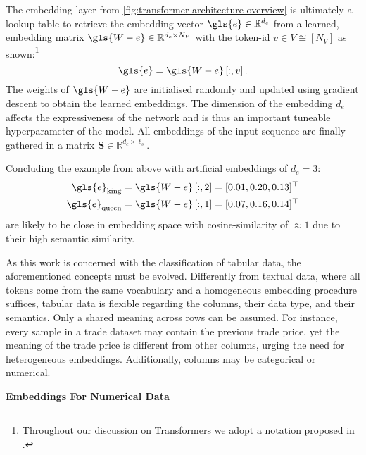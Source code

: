 The embedding layer from \cref{fig:transformer-architecture-overview} is ultimately a lookup table to retrieve the embedding vector $\gls{e} \in \mathbb{R}^{d_{e}}$ from a learned, embedding matrix $\gls{W-e} \in \mathbb{R}^{d_{e} \times N_{V}}$ with the token-id $v \in V \cong\left[N_{V}\right]$ as shown:\footnote{Throughout our discussion on Transformers we adopt a notation proposed in \textcite[][1--16]{phuongFormalAlgorithmsTransformers2022}.}
\begin{equation}
    \gls{e}=\gls{W-e}\left[:, v\right].
    \label{eq:word-embeddings}
\end{equation}
The weights of $\gls{W-e}$ are initialised randomly and updated using gradient descent to obtain the learned embeddings. The dimension of the embedding $d_e$ affects the expressiveness of the network and is thus an important tuneable hyperparameter of the model. All embeddings of the input sequence are finally gathered in a matrix $\mathbf{S} \in \mathbb{R}^{d_e \times \ell_s}$.

Concluding the example from above with artificial embeddings of $d_e=3$:
\begin{equation}
    \begin{aligned}
        \gls{e}_{\mathrm{king}}  & =\gls{W-e}\left[:,2\right] = [0.01, 0.20, 0.13]^{\top} \\
        \gls{e}_{\mathrm{queen}} & =\gls{W-e}\left[:,1\right] = [0.07, 0.16, 0.14]^{\top} \\
    \end{aligned}
\end{equation}
are likely to be close in embedding space with cosine-similarity of $\approx 1$ due to their high semantic similarity.

As this work is concerned with the classification of tabular data, the aforementioned concepts must be evolved. Differently from textual data, where all tokens come from the same vocabulary and a homogeneous embedding procedure suffices, tabular data is flexible regarding the columns, their data type, and their semantics. Only a shared meaning across rows can be assumed. For instance, every sample in a trade dataset may contain the previous trade price, yet the meaning of the trade price is different from other columns, urging the need for heterogeneous embeddings. Additionally, columns may be categorical or numerical.

\textbf{Embeddings For Numerical Data}

